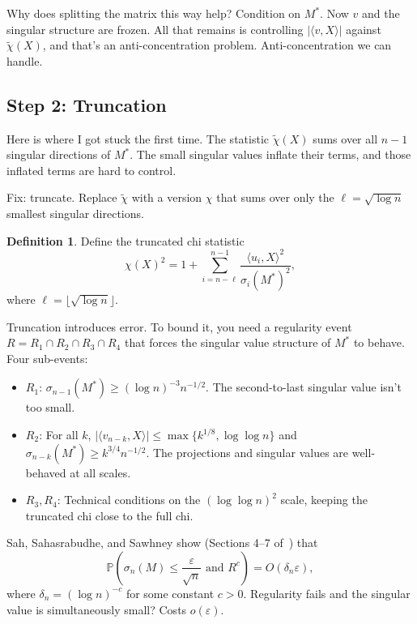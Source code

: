 \documentclass[11pt]{article}
\theoremstyle{definition}
\newtheorem{definition}[theorem]{Definition}
\theoremstyle{remark}
\newcommand{\Prob}{\mathbb{P}}
\begin{document}
Why does splitting the matrix this way help?
Condition on $M^*$. Now $v$ and the singular structure are frozen.
All that remains is controlling $|\langle v, X \rangle|$ against $\tilde{\chi}(X)$, and that's an anti-concentration problem.
Anti-concentration we can handle.

\subsection{Step 2: Truncation}
\label{sec:truncation}

Here is where I got stuck the first time. The statistic $\tilde{\chi}(X)$ sums over all $n-1$ singular directions of $M^*$. The small singular values inflate their terms, and those inflated terms are hard to control.

Fix: truncate. Replace $\tilde{\chi}$ with a version $\chi$ that sums over only the $\ell = \sqrt{\log n}$ smallest singular directions.

\begin{definition}
Define the truncated chi statistic
\[
  \chi(X)^2 = 1 + \sum_{i=n-\ell}^{n-1} \frac{\langle u_i, X \rangle^2}{\sigma_i(M^*)^2},
\]
where $\ell = \lfloor \sqrt{\log n} \rfloor$.
\end{definition}

Truncation introduces error. To bound it, you need a regularity event $R = R_1 \cap R_2 \cap R_3 \cap R_4$ that forces the singular value structure of $M^*$ to behave. Four sub-events:
\begin{itemize}
  \item $R_1$: $\sigma_{n-1}(M^*) \ge (\log n)^{-3} n^{-1/2}$. The second-to-last
    singular value isn't too small.
  \item $R_2$: For all $k$, $|\langle v_{n-k}, X \rangle| \le \max\{k^{1/8}, \log\log n\}$
    and $\sigma_{n-k}(M^*) \ge k^{3/4} n^{-1/2}$. The projections and singular values
    are well-behaved at all scales.
  \item $R_3, R_4$: Technical conditions on the $(\log\log n)^2$ scale, keeping
    the truncated chi close to the full chi.
\end{itemize}

Sah, Sahasrabudhe, and Sawhney show (Sections 4--7 of~\cite{sah2024spielman}) that
\begin{equation}
  \label{eq:truncation}
  \Prob\!\left(\sigma_n(M) \le \frac{\varepsilon}{\sqrt{n}} \text{ and } R^c\right)
  = O(\delta_n \varepsilon),
\end{equation}
where $\delta_n = (\log n)^{-c}$ for some constant $c > 0$. Regularity fails and the singular value is simultaneously small? Costs $o(\varepsilon)$.
\end{document}
